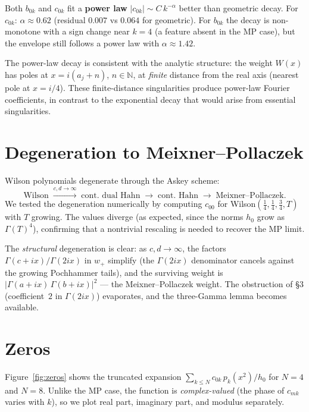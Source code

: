 \documentclass[11pt,a4paper]{article}
\newcommand{\N}{\mathbb{N}}
\begin{document}
Both $b_{0k}$ and $c_{0k}$ fit a \textbf{power law} $|c_{0k}| \sim
C\, k^{-\alpha}$ better than geometric decay.  For $c_{0k}$:
$\alpha \approx 0.62$ (residual $0.007$ vs $0.064$ for geometric).
For $b_{0k}$ the decay is non-monotone with a sign change near $k=4$
(a feature absent in the MP case), but the envelope still follows a
power law with $\alpha \approx 1.42$.

The power-law decay is consistent with the analytic structure: the
weight $W(x)$ has poles at $x = i(a_j + n)$, $n \in \N$, at
\emph{finite} distance from the real axis (nearest pole at
$x = i/4$).  These finite-distance singularities produce
power-law Fourier coefficients, in contrast to the exponential
decay that would arise from essential singularities.

\section{Degeneration to Meixner--Pollaczek}

Wilson polynomials degenerate through the Askey scheme:
\[
  \text{Wilson} \;\xrightarrow{c,d\to\infty}\;
  \text{cont.\ dual Hahn} \;\to\;
  \text{cont.\ Hahn} \;\to\;
  \text{Meixner--Pollaczek}.
\]
We tested the degeneration numerically by computing $c_{00}$ for
Wilson$(\tfrac14, \tfrac14, \tfrac34, T)$ with $T$ growing.
The values diverge (as expected, since the norms $h_0$ grow as
$\Gamma(T)^4$), confirming that a nontrivial rescaling is needed to
recover the MP limit.

The \emph{structural} degeneration is clear: as $c, d \to \infty$,
the factors $\Gamma(c{+}ix)/\Gamma(2ix)$ in $w_+$ simplify
(the $\Gamma(2ix)$ denominator cancels against the growing Pochhammer
tails), and the surviving weight is $|\Gamma(a{+}ix)\,\Gamma(b{+}ix)|^2$
--- the Meixner--Pollaczek weight.  The obstruction of \S3
(coefficient~$2$ in $\Gamma(2ix)$) evaporates, and the three-Gamma
lemma becomes available.

\section{Zeros}

Figure~\ref{fig:zeros} shows the truncated expansion
$\sum_{k \le N} c_{0k}\, p_k(x^2) / h_0$ for $N = 4$ and $N = 8$.
Unlike the MP case, the function is \emph{complex-valued} (the
phase of $c_{mk}$ varies with $k$), so we plot real part,
imaginary part, and modulus separately.
\end{document}
